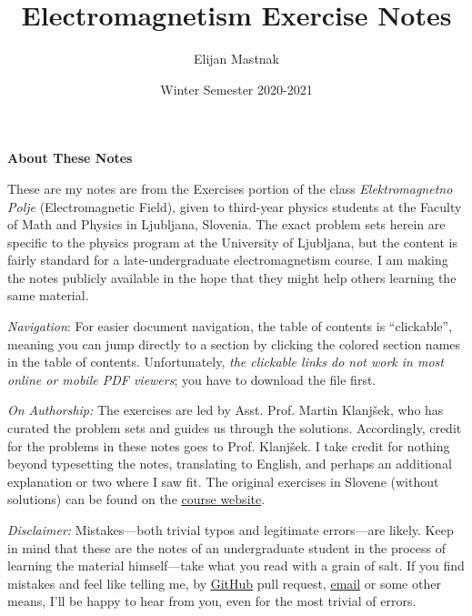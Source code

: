 \documentclass[11pt, a4paper]{article}
\begin{document}
\title{Electromagnetism Exercise Notes}
\author{Elijan Mastnak}
\date{Winter Semester 2020-2021}
\maketitle

\begin{center}
\textbf{About These Notes}
\end{center}
These are my notes are from the Exercises portion of the class \textit{Elektromagnetno Polje} (Electromagnetic Field), given to third-year physics students at the Faculty of Math and Physics in Ljubljana, Slovenia. The exact problem sets herein are specific to the physics program at the University of Ljubljana, but the content is fairly standard for a late-undergraduate electromagnetism course. I am making the notes publicly available in the hope that they might help others learning the same material.

\vspace{2mm}
\textit{Navigation}: For easier document navigation, the table of contents is ``clickable'', meaning you can jump directly to a section by clicking the colored section names in the table of contents. Unfortunately, \textit{the clickable links do not work in most online or mobile PDF viewers}; you have to download the file first.

\vspace{2mm}
\textit{On Authorship:} 
The exercises are led by Asst. Prof. Martin Klanj\v{s}ek, who has curated the problem sets and guides us through the solutions. Accordingly, credit for the problems in these notes goes to Prof. Klanj\v{s}ek. I take credit for nothing beyond typesetting the notes, translating to English, and perhaps an additional explanation or two where I saw fit. The original exercises in Slovene (without solutions) can be found on the \href{https://www-f5.ijs.si/emp-2020-2021.html}{\underline{course website}}. 

\vspace{2mm}
\textit{Disclaimer:} Mistakes---both trivial typos and legitimate errors---are likely. Keep in mind that these are the notes of an undergraduate student in the process of learning the material himself---take what you read with a grain of salt. If you find mistakes and feel like telling me, by \href{https://github.com/ejmastnak/fmf}{\underline{GitHub}} pull request, \href{mailto:ejmastnak@gmail.com}{\underline{email}} or some other means, I'll be happy to hear from you, even for the most trivial of errors.
\end{document}
